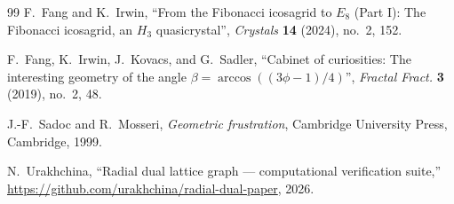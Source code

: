 \documentclass{article}
\begin{document}
\begin{thebibliography}{99}
F.~Fang and K.~Irwin,
``From the Fibonacci icosagrid to $E_8$ (Part I): The Fibonacci icosagrid, an $H_3$ quasicrystal'',
\emph{Crystals} \textbf{14} (2024), no.~2, 152.

F.~Fang, K.~Irwin, J.~Kovacs, and G.~Sadler,
``Cabinet of curiosities: The interesting geometry of the angle $\beta=\arccos((3\phi-1)/4)$'',
\emph{Fractal Fract.} \textbf{3} (2019), no.~2, 48.

J.-F.~Sadoc and R.~Mosseri,
\emph{Geometric frustration},
Cambridge University Press, Cambridge, 1999.

N.~Urakhchina,
``Radial dual lattice graph --- computational verification suite,''
\url{https://github.com/urakhchina/radial-dual-paper}, 2026.

\end{thebibliography}
\end{document}
